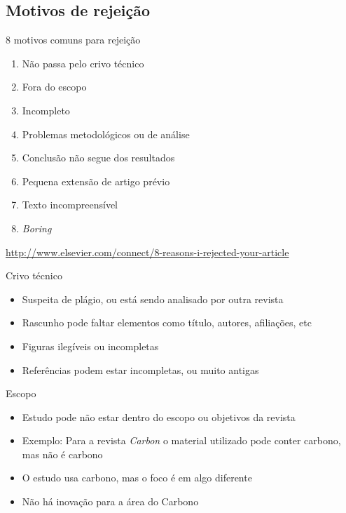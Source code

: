 \documentclass{beamer}
\begin{document}
\subsection{Motivos de rejeição}

\begin{frame}{8 motivos comuns para rejeição}
  \begin{enumerate}
    \footnotesize
  \item<1-> Não passa pelo crivo técnico
    \medskip
  \item<1-> Fora do escopo
    \medskip
  \item<1-> Incompleto
    \medskip
  \item<1-> Problemas metodológicos ou de análise
    \medskip
  \item<1-> Conclusão não segue dos resultados
    \medskip
  \item<1-> Pequena extensão de artigo prévio
    \medskip
  \item<1-> Texto incompreensível
    \medskip
  \item<1-> {\em Boring}
  \end{enumerate}

  \vfill
  \tiny
  \hfill \url{http://www.elsevier.com/connect/8-reasons-i-rejected-your-article}
\end{frame}

\begin{frame}{Crivo técnico}
  \begin{itemize}
    \footnotesize
  \item Suspeita de plágio, ou está sendo analisado por outra revista
    \bigskip
  \item Rascunho pode faltar elementos como título, autores,
    afiliações, etc
    \bigskip
  \item Figuras ilegíveis ou incompletas
    \bigskip
  \item Referências podem estar incompletas, ou muito antigas
  \end{itemize}
\end{frame}

\begin{frame}{Escopo}
  \begin{itemize}
    \footnotesize
  \item Estudo pode não estar dentro do escopo ou objetivos da revista
    \bigskip
  \item Exemplo: Para a revista {\em Carbon} o material utilizado pode
    conter carbono, mas não é carbono
    \bigskip
  \item O estudo usa carbono, mas o foco é em algo diferente
    \bigskip
  \item Não há inovação para a área do Carbono
  \end{itemize}
\end{frame}
\end{document}
